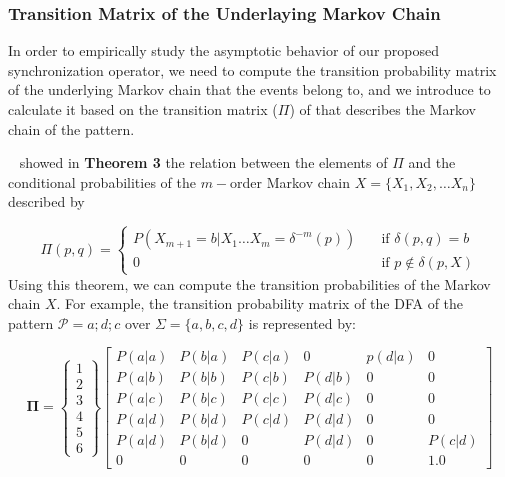 
 
\subsubsection{Transition Matrix of the Underlaying Markov Chain}

\par In order to empirically study the asymptotic behavior of our proposed synchronization operator, we need to compute the transition probability matrix of the underlying Markov chain that the events belong to, and we introduce to calculate it  based on the transition matrix ($\Pi$) of \pmcmr that describes the Markov chain of the pattern.

~\citet{nuel_pattern_2008} showed in \textbf{Theorem 3} the relation between the elements  of 
$\Pi$ and the conditional probabilities of the $m-$order Markov chain $X=\{X_1, X_2, \ldots X_n\}$ described by 

\[ \Pi(p, q) =
\begin{cases}
P(X_{m+1}=b|X_1\ldots X_m=\delta^{-m}(p))     & \quad \text{if } \delta(p,q)=b \\
0  & \quad \text{if } p \notin  \delta(p,X)
\end{cases}
\]
Using this theorem, we can compute the transition probabilities of the Markov chain $X$. For example, the transition probability matrix of the DFA of  the pattern $\mathcal{P}=a ; d ; c$ over  $\Sigma=\{a,b,c,d\}$ is  represented by: 

\begin{equation}
\label{eq:matrix}
\boldsymbol{\Pi} = 
\begin{Bmatrix} 
 1          \\ 2        \\3             \\4         \\5         \\ 6 
\end{Bmatrix}
\begin{bmatrix} 
P(a|a) 	& P(b|a) 		& P(c|a) 		& 0			  & p(d|a) 	& 0  \\
P(a|b) 	& P(b|b) 		& P(c|b) 		& P(d|b)	  & 0 	    & 0  \\
P(a|c) 	& P(b|c) 		& P(c|c) 		& P(d|c) 	  & 0 	    & 0  \\
P(a|d) 	& P(b|d) 		& P(c|d) 		& P(d|d)	  & 0 	    & 0  \\
P(a|d) 	& P(b|d) 		&  0	 	    & P(d|d)	  & 0 	    & P(c|d)  \\
0			& 0			& 0		        & 0    		  & 0		& 1.0
\end{bmatrix}
\end{equation} 

